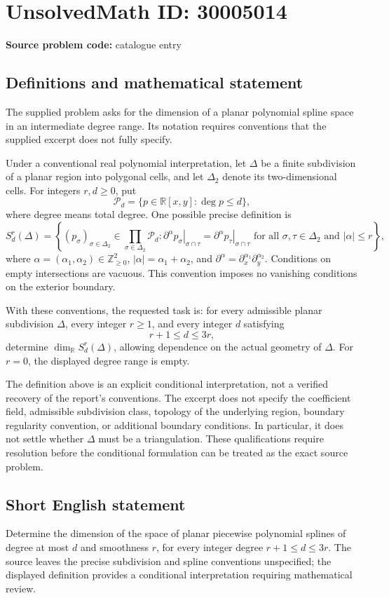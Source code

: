 \documentclass[11pt]{article}
\newcommand{\Z}{\mathbb{Z}}
\newcommand{\R}{\mathbb{R}}
\begin{document}
\section*{UnsolvedMath ID: 30005014}
\textbf{Source problem code:} catalogue entry
\subsection{Definitions and mathematical statement}
The supplied problem asks for the dimension of a planar polynomial spline space in an intermediate degree range. Its notation requires conventions that the supplied excerpt does not fully specify.

Under a conventional real polynomial interpretation, let \(\Delta\) be a finite subdivision of a planar region into polygonal cells, and let \(\Delta_2\) denote its two-dimensional cells. For integers \(r,d\geq 0\), put
\[
\mathcal P_d=\{p\in\R[x,y]:\deg p\leq d\},
\]
where degree means total degree. One possible precise definition is
\[
S_d^r(\Delta)=\left\{(p_\sigma)_{\sigma\in\Delta_2}\in\prod_{\sigma\in\Delta_2}\mathcal P_d:
\left.\partial^\alpha p_\sigma\right|_{\sigma\cap\tau}
=\left.\partial^\alpha p_\tau\right|_{\sigma\cap\tau}
\text{ for all }\sigma,\tau\in\Delta_2\text{ and }|\alpha|\leq r
\right\},
\]
where \(\alpha=(\alpha_1,\alpha_2)\in\Z_{\geq0}^2\), \(|\alpha|=\alpha_1+\alpha_2\), and \(\partial^\alpha=\partial_x^{\alpha_1}\partial_y^{\alpha_2}\). Conditions on empty intersections are vacuous. This convention imposes no vanishing conditions on the exterior boundary.

With these conventions, the requested task is: for every admissible planar subdivision \(\Delta\), every integer \(r\geq1\), and every integer \(d\) satisfying
\[
r+1\leq d\leq3r,
\]
determine \(\dim_{\R}S_d^r(\Delta)\), allowing dependence on the actual geometry of \(\Delta\). For \(r=0\), the displayed degree range is empty.

The definition above is an explicit conditional interpretation, not a verified recovery of the report's conventions. The excerpt does not specify the coefficient field, admissible subdivision class, topology of the underlying region, boundary regularity convention, or additional boundary conditions. In particular, it does not settle whether \(\Delta\) must be a triangulation. These qualifications require resolution before the conditional formulation can be treated as the exact source problem.
\subsection{Short English statement}
Determine the dimension of the space of planar piecewise polynomial splines of degree at most \(d\) and smoothness \(r\), for every integer degree \(r+1\leq d\leq3r\). The source leaves the precise subdivision and spline conventions unspecified; the displayed definition provides a conditional interpretation requiring mathematical review.
\end{document}
